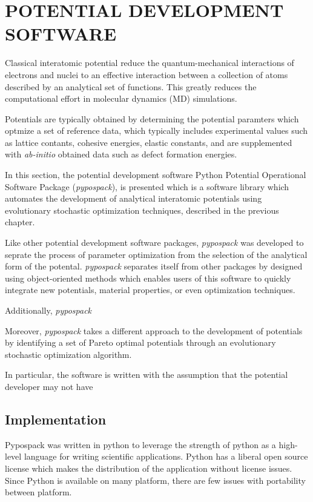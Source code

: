 \chapter{POTENTIAL DEVELOPMENT SOFTWARE}

Classical interatomic potential reduce the quantum-mechanical interactions of electrons and nuclei to an effective interaction between a collection of atoms described by an analytical set of functions.
This greatly reduces the computational effort in molecular dynamics (MD) simulations.

Potentials are typically obtained by determining the potential paramters which optmize a set of reference data, which typically includes experimental values such as lattice contants, cohesive energies, elastic constants, and are supplemented with \emph{ab-initio} obtained data such as defect formation energies.

In this section, the potential development software Python Potential Operational Software Package (\emph{pypospack}), is presented which is a software library which automates the development of analytical interatomic potentials using evolutionary stochastic optimization techniques, described in the previous chapter.

Like other potential development software packages, \emph{pypospack} was developed to seprate the process of parameter optimization from the selection of the analytical form of the potental.  \emph{pypospack} separates itself from other packages by designed using object-oriented methods which enables users of this software to quickly integrate new potentials, material properties, or even optimization techniques.

Additionally, \emph{pypospack}

Moreover, \emph{pypospack} takes a different approach to the development of potentials by identifying a set of Pareto optimal potentials through an evolutionary stochastic optimization algorithm.

In particular, the software is written with the assumption that the potential developer may not have

\section{Implementation}
Pypospack was written in python to leverage the strength of python as a high-level language for writing scientific applications.  Python has a liberal open source license which makes the distribution of the application without license issues.  Since Python is available on many platform, there are few issues with portability between platform.


